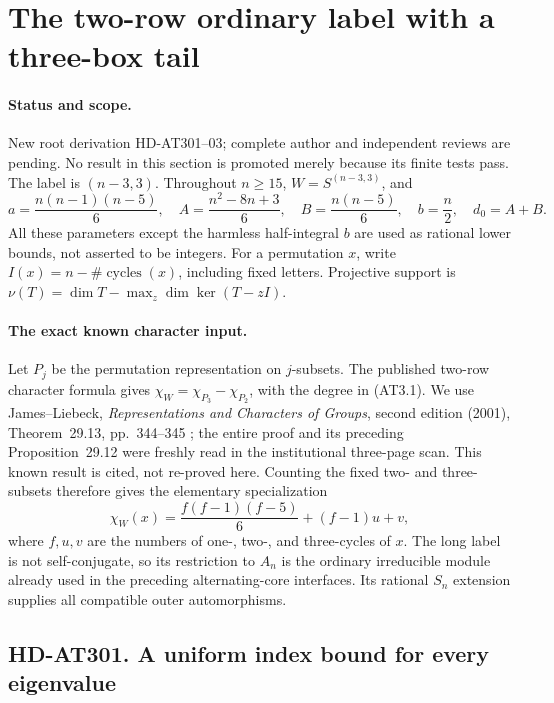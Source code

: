 \section{The two-row ordinary label with a three-box tail}
\label{sec:alternating-three-row-tail}

\paragraph{Status and scope.}
New root derivation HD-AT301--03; complete author and independent
reviews are pending.  No result in this section is promoted merely
because its finite tests pass.  The label is $(n-3,3)$.
Throughout $n\ge15$, $W=S^{(n-3,3)}$, and
\[
 a=\frac{n(n-1)(n-5)}6,\quad
 A=\frac{n^2-8n+3}6,\quad B=\frac{n(n-5)}6,\quad
 b=\frac n2,\quad d_0=A+B.                              \tag{AT3.1}
\]
All these parameters except the harmless half-integral $b$ are
used as rational lower bounds, not asserted to be integers.
For a permutation $x$, write $I(x)=n-\#\operatorname{cycles}(x)$,
including fixed letters.  Projective support is
$\nu(T)=\dim T-\max_z\dim\ker(T-zI)$.

\paragraph{The exact known character input.}
Let $P_j$ be the permutation representation on $j$-subsets.
The published two-row character formula gives
$\chi_W=\chi_{P_3}-\chi_{P_2}$, with the degree in (AT3.1).
We use James--Liebeck, \emph{Representations and Characters of
Groups}, second edition (2001), Theorem~29.13, pp.~344--345
\cite[Theorem~29.13, pp.~344--345]{HD:JamesLiebeck2001};
the entire proof and its preceding Proposition~29.12 were freshly
read in the institutional three-page scan.  This known result is
cited, not re-proved here.  Counting the fixed two- and three-subsets
therefore gives the elementary specialization
\[
 \chi_W(x)=\frac{f(f-1)(f-5)}6+(f-1)u+v,                 \tag{AT3.2}
\]
where $f,u,v$ are the numbers of one-, two-, and three-cycles of $x$.
The long label is not self-conjugate, so its restriction to $A_n$
is the ordinary irreducible module already used in the preceding
alternating-core interfaces.  Its rational $S_n$ extension supplies
all compatible outer automorphisms.

\subsection*{HD-AT301. A uniform index bound for every eigenvalue}


